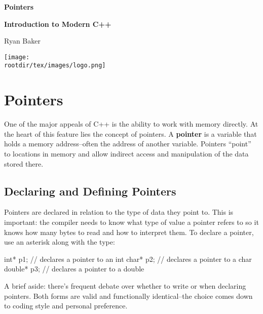 \documentclass[12pt]{article}
\begin{document}
\begin{center}

\Huge\textbf{Pointers}

\vspace{1em}

\LARGE\textbf{Introduction to Modern C++}

\vspace{1em}

\Large{Ryan Baker}

\vfill

\texttt{[image: \\rootdir/tex/images/logo.png]}

\end{center}

\vfill

\tableofcontents

\pagebreak

\section{Pointers}

\noindent
One of the major appeals of C++ is the ability to work with memory directly.
At the heart of this feature lies the concept of pointers.
A \textbf{pointer} is a variable that holds a memory address--often the address of another variable.
Pointers ``point'' to locations in memory and allow indirect access and manipulation of the data stored there.

\subsection{Declaring and Defining Pointers}

\noindent
Pointers are declared in relation to the type of data they point to.
This is important: the compiler needs to know what type of value a pointer refers to so it knows how many bytes to read and how to interpret them.
To declare a pointer, use an asterisk \inlinecxx{*} along with the type:

\begin{cxx}{}
int*    p1; // declares a pointer to an int
char*   p2; // declares a pointer to a char
double* p3; // declares a pointer to a double
\end{cxx}

\noindent
A brief aside: there's frequent debate over whether to write  or  when declaring pointers.
Both forms are valid and functionally identical--the choice comes down to coding style and personal preference.
\end{document}
